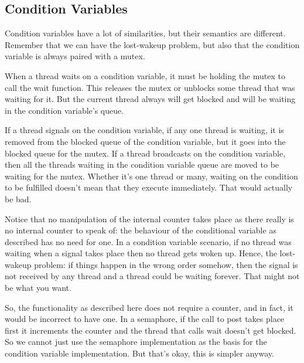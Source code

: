 \subsection*{Condition Variables}
Condition variables have a lot of similarities, but their semantics are different. Remember that we can have the lost-wakeup problem, but also that the condition variable is always paired with a mutex.

When a thread waits on a condition variable, it must be holding the mutex to call the wait function. This releases the mutex or unblocks some thread that was waiting for it. But the current thread always will get blocked and will be waiting in the condition variable's queue. 

If a thread signals on the condition variable, if any one thread is waiting, it is removed from the blocked queue of the condition variable, but it goes into the blocked queue for the mutex. If a thread broadcasts on the condition variable, then all the threads waiting in the condition variable queue are moved to be waiting for the mutex. Whether it's one thread or many, waiting on the condition to be fulfilled doesn't mean that they execute immediately. That would actually be bad.

Notice that no manipulation of the internal counter takes place as there really is no internal counter to speak of: the behaviour of the conditional variable as described has no need for one. In a condition variable scenario, if no thread was waiting when a signal takes place then no thread gets woken up. Hence, the lost-wakeup problem: if things happen in the wrong order somehow, then the signal is not received by any thread and a thread could be waiting forever. That might not be what you want. 

So, the functionality as described here does not require a counter, and in fact, it would be incorrect to have one. In a semaphore, if the call to post takes place first it increments the counter and the thread that calls wait doesn't get blocked. So we cannot just use the semaphore implementation as the basis for the condition variable implementation. But that's okay, this is simpler anyway.



